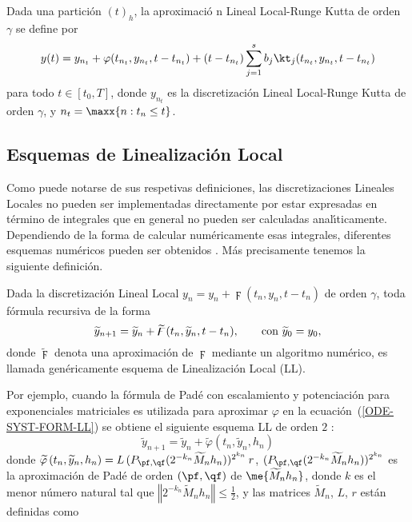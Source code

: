 \begin{definition}
	\label{definition HOLLA} \cite{Jimenez13} Dada una partici\'{o}n $(t)_{h}$, la aproximaci\'{o}%
	n Lineal Local-Runge Kutta de orden $\gamma$ se define por 
	\begin{equation*}
	y(t)=y_{n_{t}}+\varphi(t_{n_{t}},y_{n_{t}},t-t_{n_{t}})+(t-t_{n_{t}})%
	\sum_{j=1}^{s}b_{j}\kt_{j}(t_{n_{t}},y_{n_{t}},t-t_{n_{t}}) %
	\end{equation*}
	para todo $t\in[t_{0},T]$, donde $y_{n_{t}}$ es la discretizaci\'{o}n Lineal Local-Runge Kutta de orden $\gamma$, y $n_{t}=\maxx{n:t_{n}\leq t}$.
\end{definition}

\subsection{Esquemas de Linealizaci\'on Local\label{section:ESQ-LLRK}}

 Como puede notarse de sus respetivas definiciones, las
discretizaciones Lineales Locales no pueden ser implementadas directamente por
estar expresadas en término de integrales que en general no pueden ser
calculadas anal\'{\i}ticamente. Dependiendo de la forma de calcular  num\'{e}ricamente esas integrales,
 diferentes esquemas num\'{e}ricos pueden ser obtenidos \cite{Jimenez05AMC,Jimenez13}.
 M\'{a}s precisamente tenemos la siguiente definici\'{o}n.
\begin{definition}
	\label{definition LLS} Dada la discretizaci\'{o}n Lineal Local 
	  $y_n=y_{n}+\digamma(t_{n},y_{n},t-t_{n})$
	 de orden $\gamma $, toda f\'{o}rmula recursiva de la forma 
	\begin{equation*}
	 \widetilde{y}_{n+1}=\widetilde{y}_{n}+\widetilde{\digamma}(t_{n},\widetilde{y}_{n},t-t_{n})
	 , \text{ \ \ \ \
		\ con }\widetilde{y}_{0}=y_{0},
	\end{equation*}%
	donde $\widetilde{\digamma}$ denota una aproximaci\'{o}n
	de $\digamma$ mediante un algoritmo num\'{e}rico, es
	llamada gen\'{e}ricamente esquema de Linealizaci\'{o}n Local (LL).
\end{definition}

Por ejemplo, cuando la f\'{o}rmula de Pad\'{e} con escalamiento y potenciaci\'{o}n para exponenciales matriciales \cite{VanLoan03} es utilizada para
aproximar $\varphi$ en la ecuaci\'on~(\ref{ODE-SYST-FORM-LL}) se obtiene el siguiente esquema LL de orden $2$ \cite{Jimenez02AMC}:
\begin{equation} 
\widetilde{y}_{n+1}=\widetilde{y}_{n}+\widetilde{\varphi}\left( t_{n},\widetilde{y}_{n},h_{n}\right) \label{LL-scheme}
\end{equation} 
donde $\widetilde{\varphi }\left( t_{n},\widetilde{y}
_{n},h_{n}\right) =L\,(P_{\pf,\qf}(2^{-k_{n}}\widetilde{M}_{n}h_{n}))^{2^{k_{n}}}\,r$, 
$(P_{\pf,\qf}(2^{-k_{n}}\widetilde{M}_{n}h_{n}))^{2^{k_{n}}}$ es la aproximaci\'{o}n
de Pad\'{e} de orden $(\pf,\qf)$ de  $\me{\widetilde{M}_{n}h_{n}}$, donde
$k$ es el menor número natural tal que $\left\Vert 2^{-k_{n}}\widetilde{M}_{n}h_{n}\right\Vert \leq \frac{1}{2}$, 
y las matrices $\widetilde{M}_{n}$, $L$, $r$ est\'{a}n definidas como

